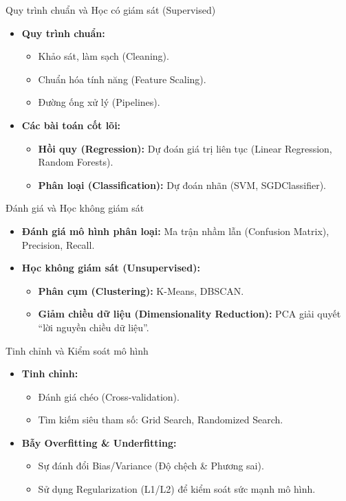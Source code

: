 \documentclass[aspectratio=169]{beamer}
\begin{document}
\begin{frame}{Quy trình chuẩn và Học có giám sát (Supervised)}
    \begin{itemize}
        \item \textbf{Quy trình chuẩn:}
        \begin{itemize}
            \item Khảo sát, làm sạch (Cleaning).
            \item Chuẩn hóa tính năng (Feature Scaling).
            \item Đường ống xử lý (Pipelines).
        \end{itemize}
        \item \textbf{Các bài toán cốt lõi:}
        \begin{itemize}
            \item \textbf{Hồi quy (Regression):} Dự đoán giá trị liên tục (Linear Regression, Random Forests).
            \item \textbf{Phân loại (Classification):} Dự đoán nhãn (SVM, SGDClassifier).
        \end{itemize}
    \end{itemize}
\end{frame}

\begin{frame}{Đánh giá và Học không giám sát}
    \begin{itemize}
        \item \textbf{Đánh giá mô hình phân loại:} Ma trận nhầm lẫn (Confusion Matrix), Precision, Recall.
        \item \textbf{Học không giám sát (Unsupervised):}
        \begin{itemize}
            \item \textbf{Phân cụm (Clustering):} K-Means, DBSCAN.
            \item \textbf{Giảm chiều dữ liệu (Dimensionality Reduction):} PCA giải quyết ``lời nguyền chiều dữ liệu''.
        \end{itemize}
    \end{itemize}
\end{frame}

\begin{frame}{Tinh chỉnh và Kiểm soát mô hình}
    \begin{itemize}
        \item \textbf{Tinh chỉnh:}
        \begin{itemize}
            \item Đánh giá chéo (Cross-validation).
            \item Tìm kiếm siêu tham số: Grid Search, Randomized Search.
        \end{itemize}
        \item \textbf{Bẫy Overfitting \& Underfitting:}
        \begin{itemize}
            \item Sự đánh đổi Bias/Variance (Độ chệch \& Phương sai).
            \item Sử dụng Regularization (L1/L2) để kiểm soát sức mạnh mô hình.
        \end{itemize}
    \end{itemize}
\end{frame}
\end{document}
